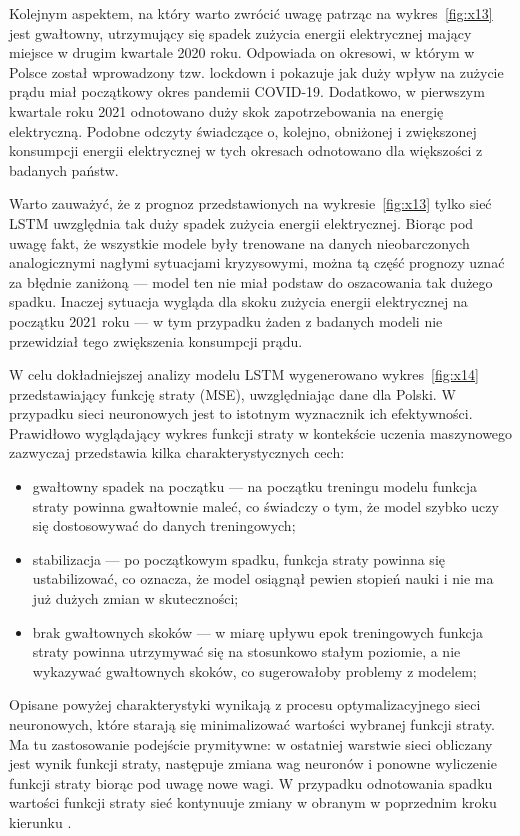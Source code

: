 \documentclass[polish, twoside, 12pt, a4paper]{article}
\theoremstyle{definition}
\theoremstyle{plain}
\theoremstyle{remark}
\begin{document}
Kolejnym aspektem, na który warto zwrócić uwagę patrząc na wykres~\ref{fig:x13} jest gwałtowny, utrzymujący się spadek zużycia energii elektrycznej mający miejsce w drugim kwartale 2020 roku. Odpowiada on okresowi, w którym w Polsce został wprowadzony tzw. lockdown i pokazuje jak duży wpływ na zużycie prądu miał początkowy okres pandemii COVID-19. Dodatkowo, w pierwszym kwartale roku 2021 odnotowano duży skok zapotrzebowania na energię elektryczną. Podobne odczyty świadczące o, kolejno, obniżonej i zwiększonej konsumpcji energii elektrycznej w tych okresach odnotowano dla większości z badanych państw. 

Warto zauważyć, że z prognoz przedstawionych na wykresie~\ref{fig:x13} tylko sieć LSTM uwzględnia tak duży spadek zużycia energii elektrycznej. Biorąc pod uwagę fakt, że wszystkie modele były trenowane na danych nieobarczonych analogicznymi nagłymi sytuacjami kryzysowymi, można tą część prognozy uznać za błędnie zaniżoną --- model ten nie miał podstaw do oszacowania tak dużego spadku. Inaczej sytuacja wygląda dla skoku zużycia energii elektrycznej na początku 2021 roku --- w tym przypadku żaden z badanych modeli nie przewidział tego zwiększenia konsumpcji prądu.

W celu dokładniejszej analizy modelu LSTM wygenerowano wykres~\ref{fig:x14} przedstawiający funkcję straty (MSE), uwzględniając dane dla Polski. W przypadku sieci neuronowych jest to istotnym wyznacznik ich efektywności. Prawidłowo wyglądający wykres funkcji straty w kontekście uczenia maszynowego zazwyczaj przedstawia kilka charakterystycznych cech:

\begin{itemize}[noitemsep]
	\item gwałtowny spadek na początku --- na początku treningu modelu funkcja straty powinna gwałtownie maleć, co świadczy o tym, że model szybko uczy się dostosowywać do danych treningowych;
	\item stabilizacja --- po początkowym spadku, funkcja straty powinna się ustabilizować, co oznacza, że model osiągnął pewien stopień nauki i nie ma już dużych zmian w skuteczności;
	\item brak gwałtownych skoków --- w miarę upływu epok treningowych funkcja straty powinna utrzymywać się na stosunkowo stałym poziomie, a nie wykazywać gwałtownych skoków, co sugerowałoby problemy z modelem;
\end{itemize}
Opisane powyżej charakterystyki wynikają z procesu optymalizacyjnego sieci neuronowych, które starają się minimalizować wartości wybranej funkcji straty. Ma tu zastosowanie podejście prymitywne: w ostatniej warstwie sieci obliczany jest wynik funkcji straty, następuje zmiana wag neuronów i ponowne wyliczenie funkcji straty biorąc pod uwagę nowe wagi. W przypadku odnotowania spadku wartości funkcji straty sieć kontynuuje zmiany w obranym w poprzednim kroku kierunku \parencite{brzezinski2021}. 
\end{document}
